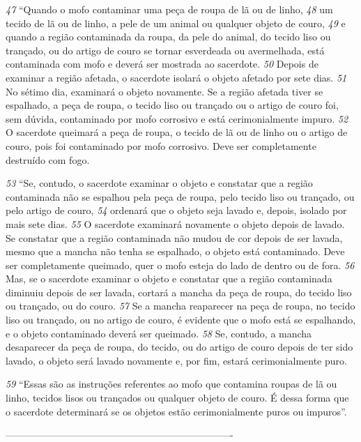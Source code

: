 \bigskip 
\textit{\tiny 47}
“Quando o mofo
 contaminar uma peça de roupa de lã ou de linho, 
\textit{\tiny 48}
um
tecido de lã ou de linho, a pele de um animal ou qualquer objeto de couro, 
\textit{\tiny 49}
e
quando a região contaminada da roupa, da pele do animal, do tecido liso ou
trançado, ou do artigo de couro se tornar esverdeada ou avermelhada, está
contaminada com mofo e deverá ser mostrada ao sacerdote. 
\textit{\tiny 50}
Depois de
examinar a região afetada, o sacerdote isolará o objeto afetado por sete dias. 
\textit{\tiny 51}
No
sétimo dia, examinará o objeto novamente. Se a região afetada tiver se espalhado,
a peça de roupa, o tecido liso ou trançado ou o artigo de couro foi, sem dúvida,
contaminado por mofo corrosivo e está cerimonialmente impuro. 
\textit{\tiny 52}
O sacerdote
queimará a peça de roupa, o tecido de lã ou de linho ou o artigo de couro, pois foi
contaminado por mofo corrosivo. Deve ser completamente destruído com fogo.

\smallskip   
\textit{\tiny 53}
“Se, contudo, o sacerdote examinar o objeto e constatar que a região
contaminada não se espalhou pela peça de roupa, pelo tecido liso ou trançado, ou
pelo artigo de couro, 
\textit{\tiny 54}
ordenará que o objeto seja lavado e, depois, isolado por
mais sete dias. 
\textit{\tiny 55}
O sacerdote examinará novamente o objeto depois de lavado. Se
constatar que a região contaminada não mudou de cor depois de ser lavada,
mesmo que a mancha não tenha se espalhado, o objeto está contaminado. Deve
ser completamente queimado, quer o mofo esteja do lado de dentro ou de fora.
\textit{\tiny 56}
Mas, se o sacerdote examinar o objeto e constatar que a região contaminada
diminuiu depois de ser lavada, cortará a mancha da peça de roupa, do tecido liso
ou trançado, ou do couro. 
\textit{\tiny 57}
Se a mancha reaparecer na peça de roupa, no tecido
liso ou trançado, ou no artigo de couro, é evidente que o mofo está se espalhando,
e o objeto contaminado deverá ser queimado. 
\textit{\tiny 58}
Se, contudo, a mancha
desaparecer da peça de roupa, do tecido, ou do artigo de couro depois de ter sido
lavado, o objeto será lavado novamente e, por fim, estará cerimonialmente puro.

\smallskip
\textit{\tiny 59}
“Essas são as instruções referentes ao mofo que contamina roupas de lã ou
linho, tecidos lisos ou trançados ou qualquer objeto de couro. É dessa forma que o
sacerdote determinará se os objetos estão cerimonialmente puros ou impuros”.

----------------------------------------------------------------------
